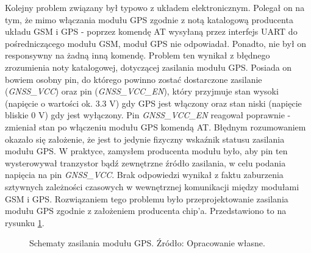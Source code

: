 Kolejny problem związany był typowo z układem elektronicznym. Polegał on na tym, że mimo włączania modułu GPS zgodnie z notą katalogową producenta układu GSM i GPS - poprzez komendę AT wysyłaną przez interfejs UART do pośredniczącego modułu GSM, moduł GPS nie odpowiadał. Ponadto, nie był on responsywny na żadną inną komendę. Problem ten wynikał z błędnego zrozumienia noty katalogowej, dotyczącej zasilania modułu GPS. Posiada on bowiem osobny pin, do którego powinno zostać dostarczone zasilanie (\textit{GNSS\_VCC}) oraz pin (\textit{GNSS\_VCC\_EN}), który przyjmuje stan wysoki (napięcie o wartości ok. 3.3 V) gdy GPS jest włączony oraz stan niski (napięcie bliskie 0 V) gdy jest wyłączony. Pin \textit{GNSS\_VCC\_EN} reagował poprawnie - zmieniał stan po włączeniu modułu GPS komendą AT. Błędnym rozumowaniem okazało się założenie, że jest to jedynie fizyczny wskaźnik statusu zasilania modułu GPS. W praktyce, zamysłem producenta modułu było, aby pin ten wysterowywał tranzystor bądź zewnętrzne źródło zasilania, w celu podania napięcia na pin \textit{GNSS\_VCC}. Brak odpowiedzi wynikał z faktu zaburzenia sztywnych zależności czasowych w wewnętrznej komunikacji między modułami GSM i GPS. Rozwiązaniem tego problemu było przeprojektowanie zasilania modułu GPS zgodnie z założeniem producenta chip'a. Przedstawiono to na rysunku \ref{fig:image_mistake_gps_power}.

\begin{figure}[H]
\centering
	\qquad
	
	\caption{Schematy zasilania modułu GPS. Źródło: Opracowanie własne.}
	\label{fig:image_mistake_gps_power}
\end{figure}

